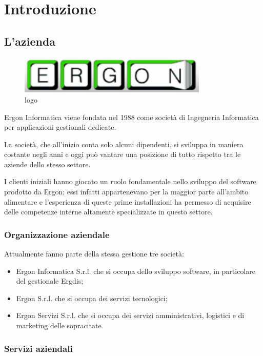 \chapter{Introduzione}

\section{L'azienda}

\begin{figure}[h]
	\includegraphics[width=9cm]{res/images/logo.png}
	\centering
	\caption{logo}
\end{figure}

Ergon Informatica viene fondata nel 1988 come società di Ingegneria Informatica per applicazioni gestionali dedicate.

La società, che all'inizio conta solo alcuni dipendenti, si sviluppa in maniera costante negli anni e oggi può vantare una posizione di tutto rispetto tra le aziende dello stesso settore.

I clienti iniziali hanno giocato un ruolo fondamentale nello sviluppo del software prodotto da Ergon; essi infatti appartenevano per la maggior parte all'ambito alimentare e l'esperienza di queste prime installazioni ha permesso di acquisire delle competenze interne altamente specializzate in questo settore. 
\subsection{Organizzazione aziendale}
Attualmente fanno parte della stessa gestione tre società:

\begin{itemize}
\item Ergon Informatica S.r.l. che si occupa dello sviluppo software, in particolare del gestionale Ergdis;
\item Ergon S.r.l. che si occupa dei servizi tecnologici;
\item Ergon Servizi S.r.l. che si occupa dei servizi amministrativi, logistici e di marketing delle sopracitate.
\end{itemize}

\subsection{Servizi aziendali}

